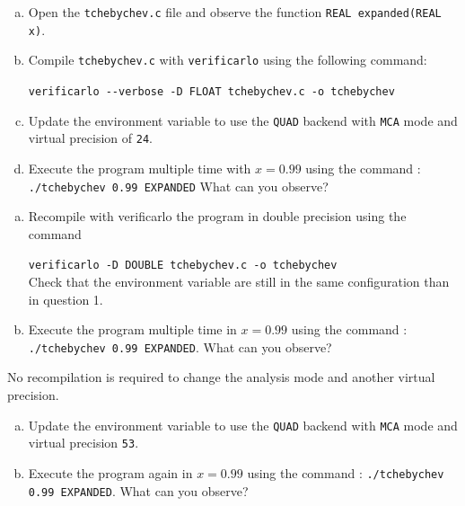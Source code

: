 \documentclass{TP}
\begin{document}
\begin{question}
  \begin{enumerate}[(a)]
  \item Open the {\tt tchebychev.c} file and observe the function {\tt REAL expanded(REAL x)}.

  \item Compile {\tt tchebychev.c} with {\tt verificarlo} using the following command:

    {\tt verificarlo -{}-verbose -D FLOAT tchebychev.c -o tchebychev}

  \item Update the environment variable to use the {\tt QUAD} backend with {\tt MCA} mode and virtual precision of {\tt 24}.
  \item Execute the program multiple time with  $x=0.99$ using the command : \newline
{\tt ./tchebychev 0.99 EXPANDED} \newline
What can you observe?
  \end{enumerate}
\end{question}



\begin{question}
  \begin{enumerate}[(a)]
  \item Recompile with verificarlo the program in double precision using the command

    {\tt verificarlo -D DOUBLE tchebychev.c -o tchebychev} \\
   Check that the environment variable are still in the same configuration than in question 1.
  \item Execute the program multiple time in $x=0.99$ using the command : {\tt ./tchebychev 0.99 EXPANDED}. \newline
What can you observe?
  \end{enumerate}
\end{question}

No recompilation is required to change the analysis mode and another virtual precision.

\begin{question}
  \begin{enumerate}[(a)]
  \item Update the environment variable to use the {\tt QUAD} backend with  {\tt MCA} mode and virtual precision  {\tt 53}.
  \item Execute the program again in $x=0.99$ using the command : {\tt ./tchebychev 0.99 EXPANDED}. \newline
What can you observe?
  \end{enumerate}
\end{question}
\end{document}
